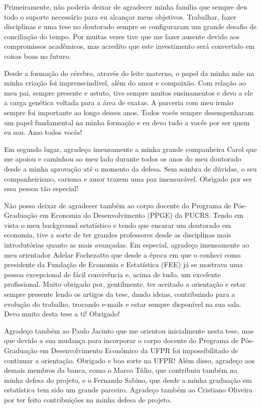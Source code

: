 \documentclass[12pt,openright,oneside,a4paper,english,french,spanish]{abntex2}
\numberwithin{table}{section} %
\numberwithin{figure}{section} %
\begin{document}
\begin{agradecimentos}
Primeiramente, não poderia deixar de agradecer minha família que sempre deu todo o suporte necessário para eu alcançar meus objetivos. Trabalhar, fazer disciplinas e uma tese no doutorado sempre se configuraram um grande desafio de conciliação do tempo. Por muitas vezes tive que me fazer ausente devido aos compromissos acadêmicos, mas acredito que este investimento será convertido em coisas boas no futuro. 

Desde a formação do cérebro, através do leite materno, o papel da minha mãe na minha criação foi imprenscindível, além do amor e compaixão. Com relação ao meu pai, sempre presente e astuto, tive sempre muitos ensinamentos e devo a ele a carga genética voltada para a área de exatas. A parceria com meu irmão sempre foi importante ao longo desses anos. Todos vocês sempre desempenharam um papel fundamental na minha formação e eu devo tudo a vocês por ser quem eu sou. Amo todos vocês!

Em segundo lugar, agradeço imensamente a minha grande companheira Carol que me apoiou e caminhou ao meu lado durante todos os anos do meu doutorado desde a minha aprovação até o momento da defesa. Sem sombra de dúvidas, o seu companheirismo, carisma e amor trazem uma paz imensurável. Obrigado por ser essa pessoa tão especial!

Não posso deixar de agradecer também ao corpo docente do Programa de Pós-Graduação em Economia do Desenvolvimento (PPGE) da PUCRS. Tendo em vista o meu background estatístico e tendo que encarar um doutorado em economia, tive a sorte de ter grandes professores desde as disciplinas mais introdutórias quanto as mais avançadas. Em especial, agradeço imensamente ao meu orientador Adelar Fochezatto que desde a época em que o conheci como presidente da Fundação de Economia e Estatística (FEE) já se mostrava uma pessoa excepcional de fácil convivência e, acima de tudo, um excelente profissional. Muito obrigado por, gentilmente, ter aceitado a orientação e estar sempre presente lendo os artigos da tese, dando ideias, contribuindo para a evolução do trabalho, trocando e-mails e estar sempre disponível na sua sala. Devo muito desta tese a ti! Obrigado!

Agradeço também ao Paulo Jacinto que me orientou inicialmente nesta tese, mas que devido a sua mudança para incorporar o corpo docente do Programa de Pós-Graduação em Desenvolvimento Econômico da UFPR foi impossibilitado de continuar a orientação. Obrigado e boa sorte na UFPR! Além disso, agradeço aos demais membros da banca, como o Marco Túlio, que contribuiu também na minha defesa do projeto, e o Fernando Sabino, que desde a minha graduação em estatística tem sido um grande parceiro. Agradeço também ao Cristiano Oliveira por ter feito contribuições na minha defesa de projeto.


\end{agradecimentos}
\end{document}
